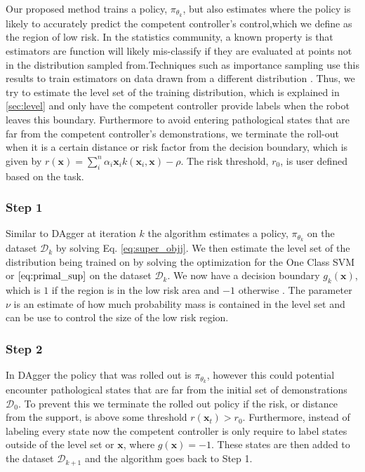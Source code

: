 \documentclass[10pt, conference]{ieeeconf}      %
\newcommand{\bx}{\mathbf{x}}
\begin{document}
Our proposed method trains a policy, $\pi_{\theta_k}$, but also estimates where the policy is likely to accurately predict the competent controller's control,which we define as the region of low risk.  In the statistics community, a known property is that estimators are function will likely mis-classify if they are evaluated at points not in the distribution sampled from.Techniques such as importance sampling use this results to train estimators on data drawn from a different distribution \cite{tokdar2010importance}.  Thus, we try to estimate the level set of the training distribution, which is explained in \ref{sec:level} and only have the competent controller provide labels when the robot leaves this boundary. Furthermore to avoid entering pathological states that are far from the competent controller's demonstrations, we terminate the roll-out when it is a certain distance or risk factor from the decision boundary, which is given by $r(\bx) = \sum_i^n \alpha_i \bx_i k(\bx_i,\bx)-\rho$. The risk threshold, $r_0$, is user defined based on the task. 

\subsubsection{Step 1}
Similar to DAgger at iteration $k$ the algorithm estimates a policy, $\pi_{\theta_k}$ on the dataset $\mathcal{D}_k$ by solving Eq. \ref{eq:super_objj}. We then estimate the level set of the distribution being trained on by solving the optimization for the One Class SVM or $\ref{eq:primal_sup}$ on the dataset $\mathcal{D}_k$. We now have a decision boundary $g_k(\bx)$, which is $1$ if the region is in the low risk area and $-1$ otherwise . The parameter $\nu$ is an estimate of how much probability mass is contained in the level set and can be use to control the size of the low risk region. 
 
 
 \subsubsection{Step 2}
 In DAgger the policy that was rolled out is $\pi_{\theta_k}$, however this could potential encounter pathological states that are far from the initial set of demonstrations $\mathcal{D}_0$. To prevent this we terminate the rolled out policy if the risk, or distance from the support, is above some threshold $r(\bx_t) > r_0$.  Furthermore, instead of labeling every state now the competent controller is only require to label states outside of the level set or $\bx$, where $g(\bx) = -1$.  These states are then added to the dataset $\mathcal{D}_{k+1}$ and the algorithm goes back to Step 1. 
\end{document}
